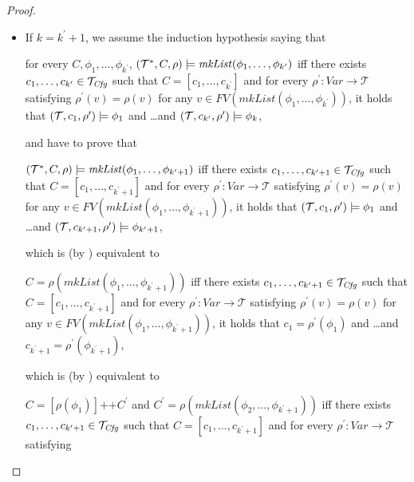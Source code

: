 \begin{proof}
\begin{itemize}
    \item If $k = k^\prime + 1$, we assume the induction hypothesis saying that
    \begin{proofenv}
    for every $C, \phi_1, \ldots, \phi_{k^\prime}$,
    $(\mathcal{T}^*, C, \rho) \models \mathit{mkList}(\phi_1,\ldots,\phi_{k^\prime})$
    iff there exists $c_1, \ldots, c_{k^\prime} \in \mathcal{T}_{\mathit{Cfg}}$ such that $C = [c_1, \ldots, c_{k^\prime}]$
    and for every $\rho^\prime : \mathit{Var} \to \mathcal{T}$ satisfying
    $\rho^\prime(v) = \rho(v)$ for any
    $v \in \mathit{FV}(\mathit{mkList}(\phi_1, \ldots, \phi_{k^\prime}))$,
    it holds that
    $(\mathcal{T}, c_1, \rho^\prime) \models \phi_1$ and \ldots and $(\mathcal{T}, c_{k^\prime}, \rho^\prime) \models \phi_k$,
    \end{proofenv}
    and have to prove that
    \begin{proofenv}
    $(\mathcal{T}^*, C, \rho) \models \mathit{mkList}(\phi_1,\ldots,\phi_{k^\prime + 1})$
    iff there exists $c_1, \ldots, c_{k^\prime + 1} \in \mathcal{T}_{\mathit{Cfg}}$ such that $C = [c_1, \ldots, c_{k^\prime + 1}]$ and 
    for every $\rho^\prime : \mathit{Var} \to \mathcal{T}$ satisfying
    $\rho^\prime(v) = \rho(v)$ for any
    $v \in \mathit{FV}(\mathit{mkList}(\phi_1, \ldots, \phi_{k^\prime + 1}))$,
    it holds that
    $(\mathcal{T}, c_1, \rho^\prime) \models \phi_1$ and \ldots and $(\mathcal{T}, c_{k^\prime + 1}, \rho^\prime) \models \phi_{k^\prime + 1}$,
    \end{proofenv}
    which is (by ) equivalent to
    \begin{proofenv}
    $C = \rho(\mathit{mkList}(\phi_1,\ldots,\phi_{k^\prime + 1}))$
    iff there exists $c_1, \ldots, c_{k^\prime + 1} \in \mathcal{T}_{\mathit{Cfg}}$ such that $C = [c_1, \ldots, c_{k^\prime + 1}]$
    and for every $\rho^\prime : \mathit{Var} \to \mathcal{T}$ satisfying
    $\rho^\prime(v) = \rho(v)$ for any
    $v \in \mathit{FV}(\mathit{mkList}(\phi_1, \ldots, \phi_{k^\prime + 1}))$,
    it holds that
    $c_1 = \rho^\prime(\phi_1)$ and \ldots and $c_{k^\prime + 1} = \rho^\prime(\phi_{k^\prime + 1})$,
    \end{proofenv}
    which is (by ) equivalent to
    \begin{proofenv}
    $C = [\rho(\phi_1)] \texttt{++} C^\prime$ and $C^\prime = \rho(\mathit{mkList}(\phi_2,\ldots,\phi_{k^\prime + 1}))$
    iff there exists $c_1, \ldots, c_{k^\prime + 1} \in \mathcal{T}_{\mathit{Cfg}}$ such that $C = [c_1, \ldots, c_{k^\prime + 1}]$
    and for every $\rho^\prime : \mathit{Var} \to \mathcal{T}$ satisfying

\end{proofenv}
\end{itemize}
\end{proof}
